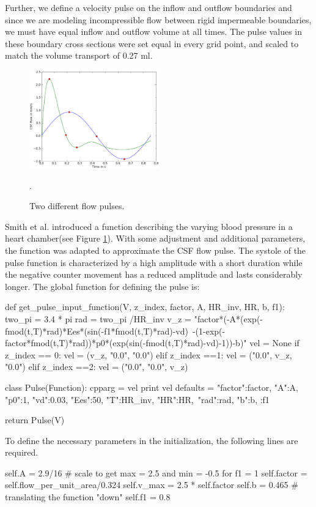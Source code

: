 Further, we define a velocity pulse on the inflow and outflow boundaries and since we are modeling incompressible flow between rigid impermeable boundaries, we must have equal inflow and outflow volume at all times. The pulse values in these boundary cross sections were set equal in every grid point, and scaled to match the volume transport of 0.27 ml. 

\begin{figure}\begin{center}
\includegraphics[width = 0.5\textwidth]{chapters/haughton/eps_images/sin_pulse.eps}
\caption{Two different flow pulses.}
\label{fig:sin_pulse}. 
\end{center}\end{figure}

Smith et al. \cite{Smith2006} introduced a function describing the varying blood pressure in a heart chamber(see Figure \ref{fig:sin_pulse}). With some adjustment and additional parameters, the function was adapted to approximate the CSF flow pulse. The systole of the pulse function is characterized by a high amplitude with a short duration while the negative counter movement has a reduced amplitude and lasts considerably longer. 
The global function for defining the pulse is:
\begin{code}
def get_pulse_input_function(V, z_index, factor, A, HR_inv, HR, b, f1):
	two_pi = 3.4 * pi
	rad = two_pi /HR_inv	
	v_z = "factor*(-A*(exp(-fmod(t,T)*rad)*Ees*(sin(-f1*fmod(t,T)*rad)-vd)\
          -(1-exp(-factor*fmod(t,T)*rad))*p0*(exp(sin(-fmod(t,T)*rad)-vd)-1))-b)"
	vel = None
	if z_index == 0:
		vel = (v_z, "0.0", "0.0")
	elif z_index ==1:
		vel = ("0.0", v_z, "0.0")
	elif z_index ==2:
		vel = ("0.0", "0.0", v_z)

	class Pulse(Function):
		cpparg = vel
		print vel
		defaults = {"factor":factor, "A":A, "p0":1, "vd":0.03, "Ees":50, "T":HR_inv, "HR":HR,\
                     "rad":rad, "b":b, :f1}

	return Pulse(V)
\end{code}
To define the necessary parameters in the initialization, the following lines are required.
\begin{code}
self.A = 2.9/16	# scale to get max = 2.5 and min = -0.5 for f1 = 1
self.factor = self.flow_per_unit_area/0.324		
self.v_max = 2.5 * self.factor
self.b = 0.465 	# translating the function "down"
self.f1 = 0.8
\end{code}

